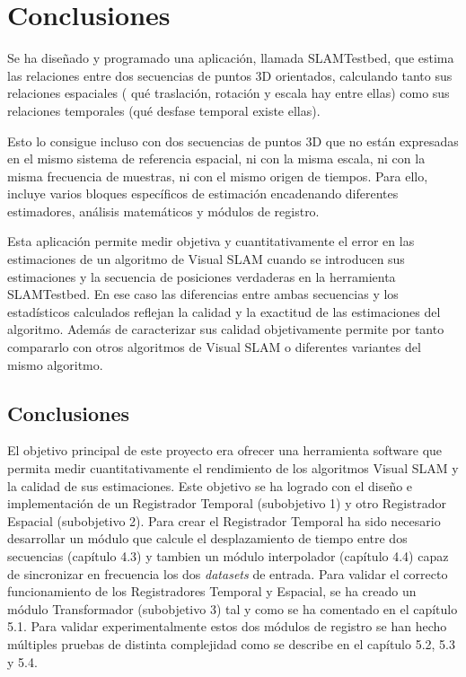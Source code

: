 \newpage

\chapter{Conclusiones} \label{cap:conclusiones}

Se ha diseñado y programado una aplicación, llamada SLAMTestbed, que estima las relaciones entre dos secuencias de puntos 3D orientados, calculando tanto sus relaciones espaciales ( qué traslación, rotación y escala hay entre ellas) como sus relaciones temporales (qué desfase temporal existe ellas).

Esto lo consigue incluso con dos secuencias de puntos 3D que no están expresadas en el mismo sistema de referencia espacial, ni con la misma escala, ni con la misma frecuencia de muestras, ni con el mismo origen de tiempos. Para ello, incluye varios bloques específicos de estimación encadenando diferentes estimadores, análisis matemáticos y módulos de registro.

Esta aplicación permite medir objetiva y cuantitativamente el error en las estimaciones de un algoritmo de Visual SLAM cuando se introducen sus estimaciones y la secuencia de posiciones verdaderas en la herramienta SLAMTestbed. En ese caso las diferencias entre ambas secuencias y los estadísticos calculados reflejan la calidad y la exactitud de las estimaciones del algoritmo.
Además de caracterizar sus calidad objetivamente permite por tanto compararlo con otros algoritmos de Visual SLAM o diferentes variantes del mismo algoritmo.


\section{Conclusiones}

El objetivo principal de este proyecto era ofrecer una herramienta software que permita medir cuantitativamente el rendimiento de los algoritmos Visual SLAM y la calidad de sus estimaciones.
Este objetivo se ha logrado con el diseño e implementación de un Registrador Temporal (subobjetivo 1) y otro Registrador Espacial (subobjetivo 2). 
Para crear el Registrador Temporal ha sido necesario desarrollar un módulo que calcule el desplazamiento de tiempo entre dos secuencias (capítulo 4.3) y tambien un módulo interpolador (capítulo 4.4) capaz de sincronizar en frecuencia los dos \textit{datasets} de entrada. Para validar el correcto funcionamiento de los Registradores Temporal y Espacial, se ha creado un módulo Transformador (subobjetivo 3) tal y como se ha comentado en el capítulo 5.1.
Para validar experimentalmente estos dos módulos de registro se han hecho múltiples pruebas de distinta complejidad como se describe en el capítulo 5.2, 5.3 y 5.4.

